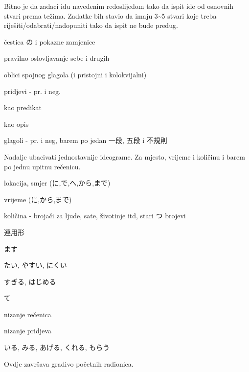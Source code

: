 
\author{Tomislav Mamić}

	
	Bitno je da zadaci idu navedenim redoslijedom tako da ispit ide od osnovnih stvari prema težima. Zadatke bih stavio da imaju 3\textasciitilde5 stvari koje treba riješiti/odabrati/nadopuniti tako da ispit ne bude predug.
	
	\begin{hyou}
		\item čestica の i pokazne zamjenice
		\item pravilno oslovljavanje sebe i drugih
		\item oblici spojnog glagola (i pristojni i kolokvijalni)
		\item pridjevi - pr. i neg.
		\begin{hyou}
			\item kao predikat
			\item kao opis
		\end{hyou}
		\item glagoli - pr. i neg, barem po jedan 一段, 五段 i 不規則
	\end{hyou}
	Nadalje ubacivati jednostavnije ideograme. Za mjesto, vrijeme i količinu i barem po jednu upitnu rečenicu.
	\begin{hyou}
		\item lokacija, smjer (に,で,へ,から,まで)
		\item vrijeme (に,から,まで)
		\item količina - brojači za ljude, sate, životinje itd, stari つ brojevi
		\item 連用形
		\begin{hyou}
			\item ます
			\item たい, やすい, にくい
			\item すぎる, はじめる
		\end{hyou}
		\item て
		\begin{hyou}
			\item nizanje rečenica
			\item nizanje pridjeva
			\item いる, みる, あげる, くれる, もらう
		\end{hyou}
	\end{hyou}
	Ovdje završava gradivo početnih radionica.
